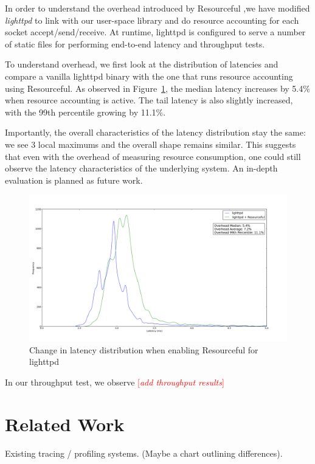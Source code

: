 \documentclass[letterpaper,twocolumn,10pt]{article}
\newcommand{\pname}{Resourceful}
\newcommand{\lnote}[1]{\textcolor{red}{[\textit{#1}]}} %
\begin{document}
In order to understand the overhead introduced by \pname{ },we have modified
\textit{lighttpd} to link with our user-space library and do resource accounting
for each socket accept/send/receive. At runtime, lighttpd is configured to serve
a number of static files for performing end-to-end latency and throughput tests.

To understand overhead, we first look at the distribution of latencies and
compare a vanilla lighttpd binary with the one that runs resource accounting
using \pname. As observed in Figure~\ref{fig:experiment1}, the median latency increases by 5.4\%
when resource accounting is active. The tail latency is also slightly increased, with the 99th percentile
growing by 11.1\%. 

Importantly, the overall characteristics of the latency distribution stay the same:
we see 3 local maximums and the overall shape remains similar. This suggests that even with the overhead
of measuring resource consumption, one could still observe the latency characteristics of the underlying system.
An in-depth evaluation is planned as future work.
\begin{figure}[ht!] 
	\centering 
	\includegraphics[width=\columnwidth]{dist_and_fit}
	\caption{Change in latency distribution when enabling \pname{ }for lighttpd} 
	\label{fig:experiment1}
\end{figure}

In our throughput test, we observe \lnote{add throughput results}



\section{Related Work} Existing tracing / profiling systems. (Maybe a chart
outlining differences).
\end{document}
